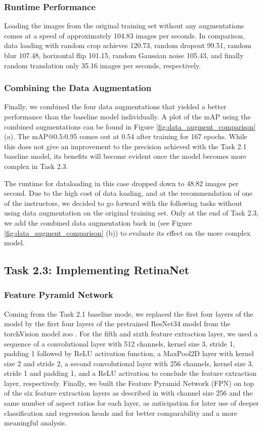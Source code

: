 \documentclass{article}
\begin{document}
\subsubsection*{Runtime Performance}
Loading the images from the original training set without any augmentations comes at a speed of approximately 104.83 images per seconds. In comparison, data loading with random crop achieves 120.73, random dropout 99.51, random blur 107.48, horizontal flip 101.15, random Gaussian noise 105.43, and finally random translation only 35.16 images per seconds, respectively.

\subsubsection*{Combining the Data Augmentation}
Finally, we combined the four data augmentations that yielded a better performance than the baseline model individually. A plot of the mAP using the combined augmentations can be found in Figure \ref{fig:data_augment_comparison} (a). The mAP@0.5:0.95 comes out at 0.54 after training for 167 epochs. While this does not give an improvement to the precision achieved with the Task 2.1 baseline model, its benefits will become evident once the model becomes more complex in Task 2.3.

The runtime for dataloading in this case dropped down to 48.82 images per second. Due to the high cost of data loading, and at the recommendation of one of the instructors, we decided to go forward with the following tasks without using data augmentation on the original training set. Only at the end of Task 2.3, we add the combined data augmentation back in (see Figure \ref{fig:data_augment_comparison} (b)) to evaluate its effect on the more complex model. 

\subsection*{Task 2.3: Implementing RetinaNet}

\subsubsection*{Feature Pyramid Network}
Coming from the Task 2.1 baseline mode, we replaced the first four layers of the model by the first four layers of the  pretrained ResNet34 model from the torchVision model zoo \cite{pytorchModelZoo}. For the fifth and sixth feature extraction layer, we used a sequence of a convolutional layer with 512 channels, kernel size 3, stride 1, padding 1 followed by ReLU activation function, a MaxPool2D layer with kernel size 2 and stride 2, a second convolutional layer with 256 channels, kernel size 3, stride 1 and padding 1, and a ReLU activation to conclude the feature extraction layer, respectively. Finally, we built the Feature Pyramid Network (FPN) on top of the six feature extraction layers as described in \cite{lin2017feature} with channel size 256 and the same number of aspect ratios for each layer, as anticipation for later use of deeper classification and regression heads and for better comparability and a more meaningful analysis.
\end{document}
